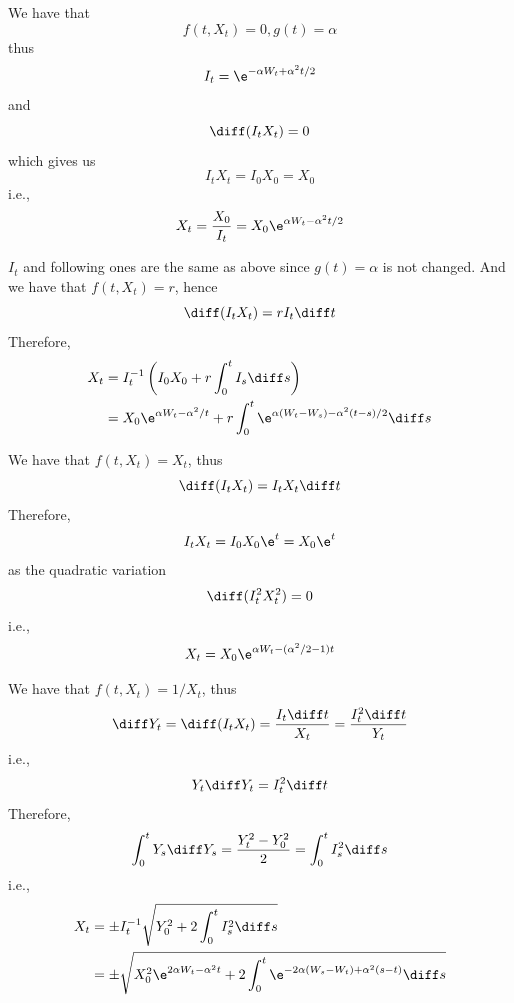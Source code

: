     \problem
    \begin{subproblem}[(\alph*)]
        \item
        We have that
        \[f(t,X_t)=0,g(t)=\alpha\]
        thus
        \[I_t=\e^{-\alpha W_t+\alpha^2t/2}\]
        and
        \[\diff(I_tX_t)=0\]
        which gives us
        \[I_tX_t=I_0X_0=X_0\]
        i.e.,
        \[X_t=\frac{X_0}{I_t}=X_0\e^{\alpha W_t-\alpha^2t/2}\]

        \item
        $I_t$ and following ones are the same as above
        since $g(t)=\alpha$ is not changed.
        And we have that $f(t,X_t)=r$, hence
        \[\diff(I_tX_t)=rI_t\diff t\]
        Therefore,
        \[\begin{aligned}
            X_t&=I_t^{-1}\left(I_0X_0+r\int_0^tI_s\diff s\right)\\
            &=X_0\e^{\alpha W_t-\alpha^2/t}+r\int_0^t\e^{\alpha(W_t-W_s)-\alpha^2(t-s)/2}\diff s
        \end{aligned}\]

        \item
        We have that $f(t,X_t)=X_t$, thus
        \[\diff(I_tX_t)=I_tX_t\diff t\]
        Therefore,
        \[I_tX_t=I_0X_0\e^t=X_0\e^t\]
        as the quadratic variation
        \[\diff(I_t^2X_t^2)=0\]
        i.e.,
        \[X_t=X_0\e^{\alpha W_t-(\alpha^2/2-1)t}\]

        \item
        We have that $f(t,X_t)=1/X_t$, thus
        \[\diff Y_t=\diff(I_tX_t)=\frac{I_t\diff t}{X_t}
        =\frac{I_t^2\diff t}{Y_t}\]
        i.e.,
        \[Y_t\diff Y_t=I_t^2\diff t\]
        Therefore,
        \[\int_0^tY_s\diff Y_s=\frac{Y_t^2-Y_0^2}{2}=\int_0^tI_s^2\diff s\]
        i.e.,
        \[\begin{aligned}
            X_t&=\pm I_t^{-1}\sqrt{Y_0^2+2\int_0^tI_s^2\diff s}\\
            &=\pm\sqrt{X_0^2\e^{2\alpha W_t-\alpha^2t}
            +2\int_0^t\e^{-2\alpha(W_s-W_t)+\alpha^2(s-t)}\diff s}
        \end{aligned}\]

    \end{subproblem}

